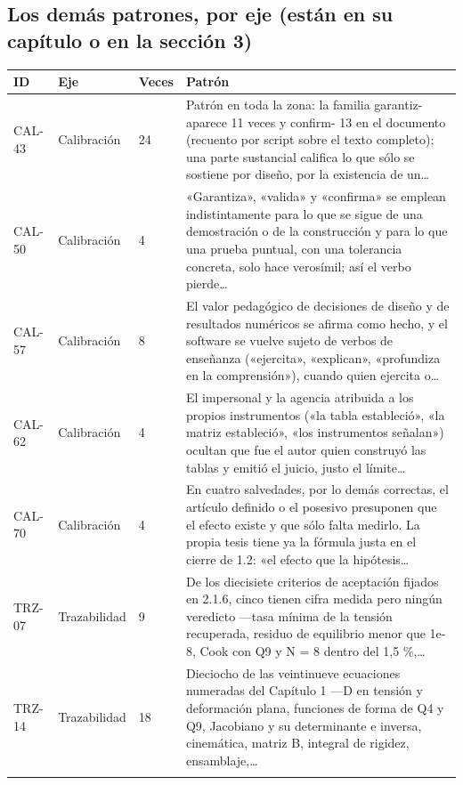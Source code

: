 \subsection*{Los demás patrones, por eje (están en su capítulo o en la sección 3)}
{\small\begin{longtable}{@{}L{1.4cm}L{2.6cm}L{1.2cm}L{10.05cm}@{}}\toprule
\sffamily\bfseries ID & \sffamily\bfseries Eje & \sffamily\bfseries Veces & \sffamily\bfseries Patrón\\\midrule\endhead\bottomrule\endfoot
CAL-43 & Calibración & 24 & Patrón en toda la zona: la familia garantiz- aparece 11 veces y confirm- 13 en el documento (recuento por script sobre el texto completo); una parte sustancial califica lo que sólo se sostiene por diseño, por la existencia de un…\\\addlinespace[2pt]
CAL-50 & Calibración & 4 & «Garantiza», «valida» y «confirma» se emplean indistintamente para lo que se sigue de una demostración o de la construcción y para lo que una prueba puntual, con una tolerancia concreta, solo hace verosímil; así el verbo pierde…\\\addlinespace[2pt]
CAL-57 & Calibración & 8 & El valor pedagógico de decisiones de diseño y de resultados numéricos se afirma como hecho, y el software se vuelve sujeto de verbos de enseñanza («ejercita», «explican», «profundiza en la comprensión»), cuando quien ejercita o…\\\addlinespace[2pt]
CAL-62 & Calibración & 4 & El impersonal y la agencia atribuida a los propios instrumentos («la tabla estableció», «la matriz estableció», «los instrumentos señalan») ocultan que fue el autor quien construyó las tablas y emitió el juicio, justo el límite…\\\addlinespace[2pt]
CAL-70 & Calibración & 4 & En cuatro salvedades, por lo demás correctas, el artículo definido o el posesivo presuponen que el efecto existe y que sólo falta medirlo. La propia tesis tiene ya la fórmula justa en el cierre de 1.2: «el efecto que la hipótesis…\\\addlinespace[2pt]
TRZ-07 & Trazabilidad & 9 & De los diecisiete criterios de aceptación fijados en 2.1.6, cinco tienen cifra medida pero ningún veredicto —tasa mínima de la tensión recuperada, residuo de equilibrio menor que 1e-8, Cook con Q9 y N = 8 dentro del 1,5 \%,…\\\addlinespace[2pt]
TRZ-14 & Trazabilidad & 18 & Dieciocho de las veintinueve ecuaciones numeradas del Capítulo 1 —D en tensión y deformación plana, funciones de forma de Q4 y Q9, Jacobiano y su determinante e inversa, cinemática, matriz B, integral de rigidez, ensamblaje,…\\\addlinespace[2pt]

\end{longtable}}

